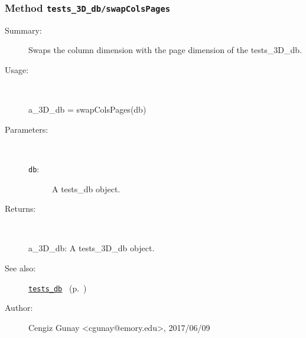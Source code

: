 \subsubsection[Method \texttt{swapColsPages}]{Method \texttt{tests\_3D\_db/swapColsPages}}%
%
\label{ref_tests_3D_db__swapColsPages}%
\hypertarget{ref_tests_3D_db__swapColsPages}{}%
\begin{description}
\item[Summary:]Swaps the column dimension with the page dimension of the
		  tests\_3D\_db.
%
\item[Usage:]~%
\begin{lyxcode}%
a\_3D\_db = swapColsPages(db)
%
\end{lyxcode}%
%
%
\item[Parameters:]~
\begin{description}%
\item[\texttt{db}:]
 A tests\_db object.
\end{description}%
%
\item[Returns:
]~

	a\_3D\_db: A tests\_3D\_db object.
%
%
\item[See also:]%
\hyperlink{ref_tests_db}{\texttt{tests\_db}}%
\ (p.~\pageref{ref_tests_db})%
%
%
\item[Author:]%
Cengiz Gunay <cgunay@emory.edu>, 2017/06/09
%
\end{description}
\methodline%
